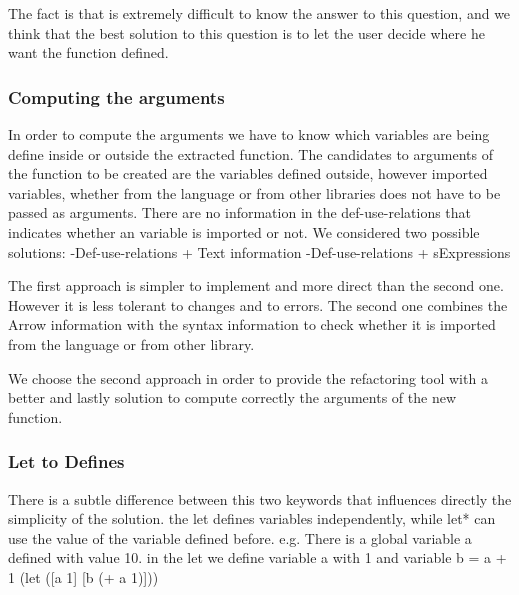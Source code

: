 The fact is that is extremely difficult to know the answer to this question, and
we think that the best solution to this question is to let the user decide where
he want the function defined.


\subsubsection{Computing the arguments}

In order to compute the arguments we have to know which variables are being define
inside or outside the extracted function.
The candidates to arguments of the function to be created are the variables defined
outside, however imported variables, whether from the language or from other libraries
does not have to be passed as arguments.
There are no information in the def-use-relations that indicates whether an variable
is imported or not.
We considered two possible solutions:
  -Def-use-relations + Text information
  -Def-use-relations + sExpressions

The first approach is simpler to implement and more direct than the second one.
However it is less tolerant to changes and to errors.
The second one combines the Arrow information with the syntax information to
check whether it is imported from the language or from other library.

We choose the second approach in order to provide the refactoring tool with a
better and lastly solution to compute correctly the arguments of the new function.

\subsubsection{Let to Defines}

There is a subtle difference between this two keywords that influences directly the simplicity of the solution.
the let defines variables independently, while let* can use the value of the variable defined before.
e.g.
There is a global variable a defined with value 10.
in the let we define variable a with 1 and variable b = a + 1
(let ([a 1]
[b (+ a 1)]))

